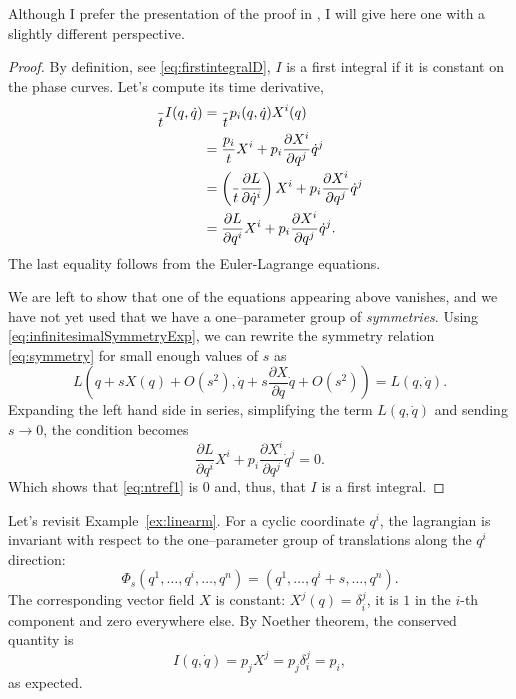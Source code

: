 \documentclass[english,fontsize=11pt,paper=a5,oneside]{scrbook}
\let\d\relax
\newcommand{\d}{\mathrm{d}}
\theoremstyle{definition}
\newenvironment{example}
  {\pushQED{\qed}\renewcommand{\qedsymbol}{$\lozenge$}\examplex}
  {\popQED\endexamplex}
\begin{document}
Although I prefer the presentation of the proof in \cite[Chapter 20.B]{book:arnold}, I will give here one with a slightly different perspective.
\begin{proof}
  By definition, see \eqref{eq:firstintegralD}, $I$ is a first integral if it is constant on the phase curves.
  Let's compute its time derivative,
  \begin{align}
    \frac{\d}{\d t} I(q, \dot q)
     & = \frac{\d}{\d t} p_i(q, \dot q) X^i(q)                                                                                 \\
     & = \frac{\d p_i}{\d t} X^i + p_i \frac{\partial X^i}{\partial q^j} \dot q^j                                              \\
     & = \left(\frac{\d}{\d t}\frac{\partial L}{\partial \dot q^i}\right) X^i + p_i \frac{\partial X^i}{\partial q^j} \dot q^j \\
     & = \frac{\partial L}{\partial q^i} X^i + p_i \frac{\partial X^i}{\partial q^j} \dot q^j. \label{eq:ntref1}
  \end{align}
  The last equality follows from the Euler-Lagrange equations.

  We are left to show that one of the equations appearing above vanishes, and we have not yet used that we have a one--parameter group of \emph{symmetries}.
  Using \eqref{eq:infinitesimalSymmetryExp}, we can rewrite the symmetry relation \eqref{eq:symmetry} for small enough values of $s$ as
  \begin{equation}\label{eq:invariance}
    L\left( q + s X(q) + O(s^2), \dot q + s \frac{\partial X}{\partial q} \dot q + O(s^2) \right) = L(q, \dot q).
  \end{equation}
  Expanding the left hand side in series, simplifying the term $L(q, \dot q)$ and sending $s\to 0$, the condition becomes
  \begin{equation}\label{eq:ntref2}
    \frac{\partial L}{\partial q^i} X^i + p_i \frac{\partial X^i}{\partial q^j} \dot q^j = 0.
  \end{equation}
  Which shows that \eqref{eq:ntref1} is $0$ and, thus, that $I$ is a first integral.
\end{proof}

\begin{example}[kinetic momentum - reprise]\label{exa:kmom}
  Let's revisit Example~\ref{ex:linearm}.
  For a cyclic coordinate $q^i$, the lagrangian is invariant with respect to the one--parameter group of translations along the $q^i$ direction:
  \begin{equation}
    \Phi_s(q^1, \ldots, q^i, \ldots, q^n) = (q^1, \ldots, q^i + s, \ldots, q^n).
  \end{equation}
  The corresponding vector field $X$ is constant: $X^j(q) = \delta^j_i$, it is $1$ in the $i$-th component and zero everywhere else.
  By Noether theorem, the conserved quantity is
  \begin{equation}
    I(q,\dot q) = p_j X^j = p_j \delta^j_i = p_i,
  \end{equation}
  as expected.
\end{example}
\end{document}
